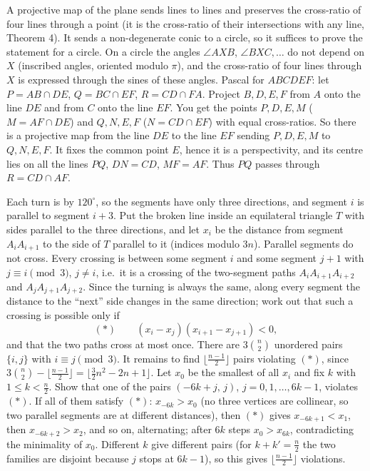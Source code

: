 \documentclass[11pt,a4paper]{article}
\begin{document}
 A projective map of the plane sends lines to lines and preserves the cross-ratio of four lines through a point (it is the cross-ratio of their intersections with any line, Theorem 4). It sends a non-degenerate conic to a circle, so it suffices to prove the statement for a circle.
 On a circle the angles $\angle AXB$, $\angle BXC,\dots$ do not depend on $X$ (inscribed angles, oriented modulo $\pi$), and the cross-ratio of four lines through $X$ is expressed through the sines of these angles.
 Pascal for $ABCDEF$: let $P=AB\cap DE$, $Q=BC\cap EF$, $R=CD\cap FA$. Project $B,D,E,F$ from $A$ onto the line $DE$ and from $C$ onto the line $EF$. You get the points $P,D,E,M$ ($M=AF\cap DE$) and $Q,N,E,F$ ($N=CD\cap EF$) with equal cross-ratios.
 So there is a projective map from the line $DE$ to the line $EF$ sending $P,D,E,M$ to $Q,N,E,F$. It fixes the common point $E$, hence it is a perspectivity, and its centre lies on all the lines $PQ$, $DN=CD$, $MF=AF$. Thus $PQ$ passes through $R=CD\cap AF$.

 Each turn is by $120^\circ$, so the segments have only three directions, and segment $i$ is parallel to segment $i+3$. Put the broken line inside an equilateral triangle $T$ with sides parallel to the three directions, and let $x_i$ be the distance from segment $A_iA_{i+1}$ to the side of $T$ parallel to it (indices modulo $3n$).
 Parallel segments do not cross. Every crossing is between some segment $i$ and some segment $j+1$ with $j\equiv i\pmod3$, $j\ne i$, i.e.\ it is a crossing of the two-segment paths $A_iA_{i+1}A_{i+2}$ and $A_jA_{j+1}A_{j+2}$. Since the turning is always the same, along every segment the distance to the ``next'' side changes in the same direction; work out that such a crossing is possible only if
\[(*)\qquad (x_i-x_j)(x_{i+1}-x_{j+1})<0,\]
and that the two paths cross at most once. There are $3\binom n2$ unordered pairs $\{i,j\}$ with $i\equiv j\pmod3$.
 It remains to find $\bigl\lfloor\frac{n-1}2\bigr\rfloor$ pairs violating $(*)$, since $3\binom n2-\bigl\lfloor\frac{n-1}2\bigr\rfloor=\bigl\lfloor\frac32n^2-2n+1\bigr\rfloor$. Let $x_0$ be the smallest of all $x_i$ and fix $k$ with $1\le k<\frac n2$. Show that one of the pairs $(-6k+j,\,j)$, $j=0,1,\dots,6k-1$, violates $(*)$.
 If all of them satisfy $(*)$: $x_{-6k}>x_0$ (no three vertices are collinear, so two parallel segments are at different distances), then $(*)$ gives $x_{-6k+1}<x_1$, then $x_{-6k+2}>x_2$, and so on, alternating; after $6k$ steps $x_0>x_{6k}$, contradicting the minimality of $x_0$. Different $k$ give different pairs (for $k+k'=\frac n2$ the two families are disjoint because $j$ stops at $6k-1$), so this gives $\bigl\lfloor\frac{n-1}2\bigr\rfloor$ violations.
\end{document}
